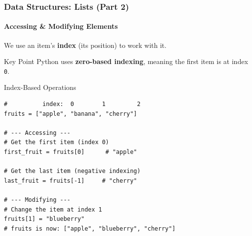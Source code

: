 \documentclass{beamer}
\begin{document}
\begin{frame}[fragile]
    \frametitle{Data Structures: Lists (Part 2)}
    \framesubtitle{Accessing \& Modifying Elements}

    We use an item's \textbf{index} (its position) to work with it.
    \begin{alertblock}{Key Point}
        Python uses \textbf{zero-based indexing}, meaning the first item is at index \texttt{0}.
    \end{alertblock}

    \begin{block}{Index-Based Operations}
        \begin{verbatim}
#          index:  0        1         2
fruits = ["apple", "banana", "cherry"]

# --- Accessing ---
# Get the first item (index 0)
first_fruit = fruits[0]      # "apple"

# Get the last item (negative indexing)
last_fruit = fruits[-1]     # "cherry"

# --- Modifying ---
# Change the item at index 1
fruits[1] = "blueberry" 
# fruits is now: ["apple", "blueberry", "cherry"]
        \end{verbatim}
    \end{block}
\end{frame}
\end{document}
